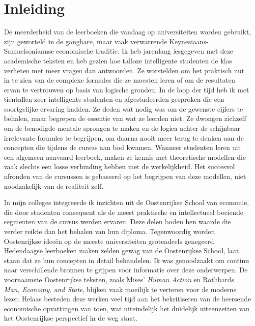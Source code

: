 \chapter{Inleiding}
De meerderheid van de leerboeken die vandaag op universiteiten worden gebruikt, zijn geworteld in de gangbare, maar vaak verwarrende Keynesiaans-Samuelsoniaanse economische traditie. Ik heb jarenlang lesgegeven met deze academische teksten en heb gezien hoe talloze intelligente studenten de klas verlieten met meer vragen dan antwoorden. Ze worstelden om het praktisch nut in te zien van de complexe formules die ze moesten leren of om de resultaten ervan te vertrouwen op basis van logische gronden. In de loop der tijd heb ik met tientallen zeer intelligente studenten en afgestudeerden gesproken die een soortgelijke ervaring hadden. Ze deden wat nodig was om de gewenste cijfers te behalen, maar begrepen de essentie van wat ze leerden niet. Ze dwongen zichzelf om de benodigde mentale sprongen te maken en de logica achter de schijnbaar irrelevante formules te begrijpen, om daarna nooit meer terug te denken aan de concepten die tijdens de cursus aan bod kwamen. Wanneer studenten leren uit een algemeen aanvaard leerboek, maken ze kennis met theoretische modellen die vaak slechts een losse verbinding hebben met de werkelijkheid. Het succesvol afronden van de cursussen is gebaseerd op het begrijpen van deze modellen, niet noodzakelijk van de realiteit zelf.

In mijn colleges integreerde ik inzichten uit de Oostenrijkse School van economie, die door studenten consequent als de meest praktische en intellectueel boeiende segmenten van de cursus werden ervaren. Deze delen boden hen waarde die verder reikte dan het behalen van hun diploma. Tegenwoordig worden Oostenrijkse ideeën op de meeste universiteiten grotendeels genegeerd. Hedendaagse leerboeken maken zelden gewag van de Oostenrijkse School, laat staan dat ze hun concepten in detail behandelen. Ik was genoodzaakt om continu naar verschillende bronnen te grijpen voor informatie over deze onderwerpen. De voornaamste Oostenrijkse teksten, zoals Mises' \textit{Human Action} en Rothbards \textit{Man, Economy, and State}, blijken vaak moeilijk te verteren voor de moderne lezer. Helaas besteden deze werken veel tijd aan het bekritiseren van de heersende economische opvattingen van toen, wat uiteindelijk het duidelijk uiteenzetten van het Oostenrijkse perspectief in de weg staat.

